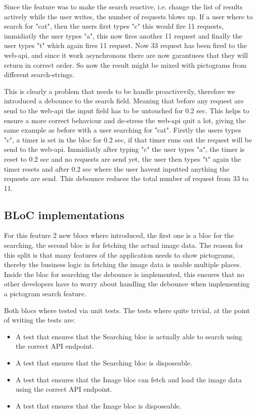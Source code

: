 Since the feature was to make the search reactive, i.e. change the list of results actively while the user writes, the number of requests blows up. If a user where to search for "cat", then the users first types "c" this would fire 11 requests, immidiatly the user types "a", this now fires another 11 request and finally the user types "t" which again fires 11 request. Now 33 request has been fired to the web-api, and since it work asynchronous there are now garantuees that they will return in correct order. So now the result might be mixed with pictograms from different search-strings.

This is clearly a problem that needs to be handle proactivevily, therefore we introduced a debounce to the search field. Meaning that before any request are send to the web-api the input field has to be untouched for 0.2 sec. This helps to ensure a more correct behaviour and de-stress the web-api quit a lot, giving the same example as before with a user searching for "cat". Firstly the users types "c", a timer is set in the \gls{bloc} for 0.2 sec, if that timer runs out the request will be send to the web-api. Immidiatly after typing "c" the user types "a", the timer is reset to 0.2 sec and no requests are send yet, the user then types "t" again the timer resets and after 0.2 sec where the user havent inputted anything the requests are send. This debounce reduces the total number of request from 33 to 11.

\subsection{BLoC implementations}
For this feature 2 new \glspl{bloc} where introduced, the first one is a \gls{bloc} for the searching, the second \gls{bloc} is for fetching the actual image data. The reason for this split is that many features of the application needs to show pictograms, thereby the business logic in fetching the image data is usable multiple places. Inside the \gls{bloc} for searching the debounce is implemented, this ensures that no other developers have to worry about handling the debounce when implementing a pictogram search feature.

Both \glspl{bloc} where tested via unit tests. The tests where quite trivial, at the point of writing the tests are:

\begin{itemize}
  \item A test that ensures that the Searching \gls{bloc} is actually able to search using the correct API endpoint.
  \item A test that ensures that the Searching \gls{bloc} is disposeable.
  \item A test that ensures that the Image \gls{bloc} can fetch and load the image data using the correct API endpoint.
  \item A test that ensures that the Image \gls{bloc} is disposeable.
\end{itemize}

